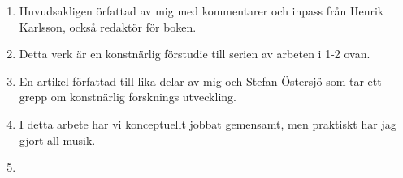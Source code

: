 \documentclass[a4paper]{article}
\begin{document}
\begin{enumerate}
\vspace{0.4cm}

\item {}

Huvudsakligen örfattad av mig med kommentarer och inpass från Henrik Karlsson, också redaktör för boken.

\vspace{0.4cm}

\item {}

Detta verk är en konstnärlig förstudie till serien av arbeten i 1-2 ovan.

\vspace{0.4cm}

\item {}

En artikel författad till lika delar av mig och Stefan Östersjö som tar ett grepp om konstnärlig forsknings utveckling.

\vspace{0.4cm}

\item {}

I detta arbete har vi konceptuellt jobbat gemensamt, men praktiskt har jag gjort all musik.

\vspace{0.4cm}

\item {}

\end{enumerate}
\end{document}
